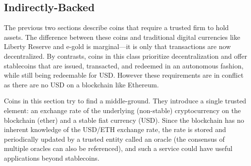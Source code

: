 


\subsection{Indirectly-Backed}
\label{sec:dai}

The previous two sections describe coins that require a trusted firm to hold assets. The difference between these coins and traditional digital currencies like Liberty Reserve and e-gold is marginal---it is only that transactions are now decentralized. By contrasts, coins in this class prioritize decentralization and offer stablecoins that are issued, transacted, and redeemed in an autonomous fashion, while still being redeemable for USD. However these requirements are in conflict as there are no USD on a blockchain like Ethereum.

Coins in this section try to find a middle-ground. They introduce a single trusted element: an exchange rate of the underlying (non-stable) cryptocurrency on the blockchain (\eg ether) and a stable fiat currency (\eg USD). Since the blockchain has no inherent knowledge of the USD/ETH exchange rate, the rate is stored and periodically updated by a trusted entity called an oracle (the consensus of multiple oracles can also be referenced), and such a service could have useful applications beyond stablecoins.

